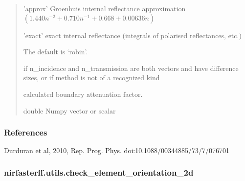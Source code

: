\documentclass[letterpaper,10pt,english]{sphinxmanual}
\begin{document}
\begin{fulllineitems}
\begin{quote}
\begin{description}
\begin{itemize}
\sphinxAtStartPar
’approx’ \sphinxhyphen{} Groenhuis internal reflectance approximation \((1.440n^{-2} + 0.710n^{-1} + 0.668 + 0.00636n)\)

\sphinxAtStartPar
’exact’  \sphinxhyphen{} exact internal reflectance (integrals of polarised reflectances, etc.)

\sphinxAtStartPar
The default is ‘robin’.


\end{itemize}

\sphinxAtStartPar
{} \textendash{} if n\_incidence and n\_transmission are both vectors and have difference sizes, or if method is not of a recognized kind

\sphinxAtStartPar
{} \textendash{} calculated boundary attenuation factor.

\sphinxAtStartPar
double Numpy vector or scalar

\end{description}\end{quote}
\subsubsection*{References}

\sphinxAtStartPar
Durduran et al, 2010, Rep. Prog. Phys. doi:10.1088/0034\sphinxhyphen{}4885/73/7/076701

\end{fulllineitems}


\sphinxstepscope


\subsubsection{nirfasterff.utils.check\_element\_orientation\_2d}
\label{\detokenize{_autosummary/nirfasterff.utils.check_element_orientation_2d:nirfasterff-utils-check-element-orientation-2d}}\label{\detokenize{_autosummary/nirfasterff.utils.check_element_orientation_2d::doc}}
\end{document}
